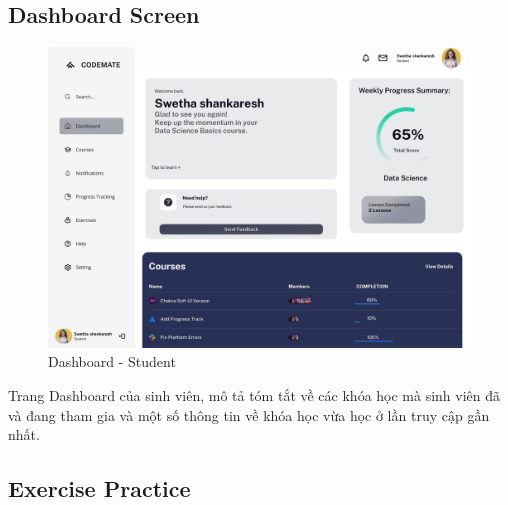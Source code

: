 \subsection{Dashboard Screen}
\begin{figure}[H]
    \centering
    \includegraphics[width=1\linewidth]{Images/figmaDesign/Dashboard - Student.png}
    \caption{Dashboard - Student}
    \label{fig:enter-label}
\end{figure}
Trang Dashboard của sinh viên, mô tả tóm tắt về các khóa học mà sinh viên đã và đang tham gia và một số thông tin về khóa học vừa học ở lần truy cập gần nhất.
\subsection{Exercise Practice}
